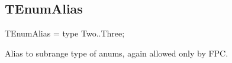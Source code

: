 \documentclass{report}
\begin{document}
\subsection*{TEnumAlias}
\begin{list}{}{
\setlength{\itemindent}{0cm}
\setlength{\listparindent}{0cm}
\setlength{\leftmargin}{\evensidemargin}
\addtolength{\leftmargin}{\tmplength}
\settowidth{\labelsep}{X}
\addtolength{\leftmargin}{\labelsep}
\setlength{\labelwidth}{\tmplength}
}
\begin{flushleft}
\item[\textbf{Declaration}\hfill]
\begin{ttfamily}
TEnumAlias = type Two..Three;\end{ttfamily}


\end{flushleft}
\par
\item[\textbf{Description}]
Alias to subrange type of anums, again allowed only by FPC.

\end{list}
\end{document}
